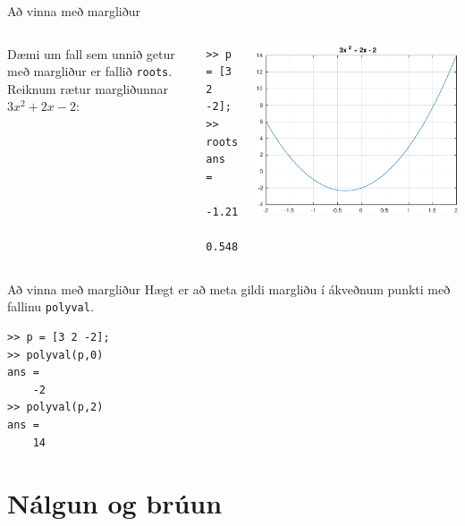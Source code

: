 \documentclass{beamer}
\begin{document}
\begin{frame}[fragile]{Að vinna með margliður}
\begin{columns}
Dæmi um fall sem unnið getur með margliður er fallið \texttt{roots}. Reiknum rætur margliðunnar $3x^2 + 2x - 2$:
\begin{verbatim}
>> p = [3 2 -2];
>> roots(p)
ans =
   -1.2153
    0.5486
\end{verbatim}
\includegraphics[width=\linewidth]{Pics/poly-example}
\end{columns}
\end{frame}

\begin{frame}[fragile]{Að vinna með margliður}
Hægt er að meta gildi margliðu í ákveðnum punkti með fallinu \texttt{polyval}.
\begin{verbatim}
>> p = [3 2 -2];
>> polyval(p,0)
ans =
    -2
>> polyval(p,2)
ans =
    14
\end{verbatim}
\end{frame}

\section{Nálgun og brúun}
\end{document}

